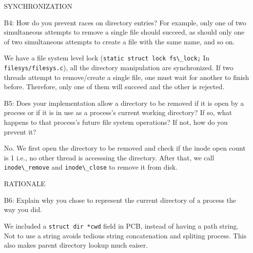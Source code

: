 \begin{aspect}{SYNCHRONIZATION}
	\begin{qc}
		B4: How do you prevent races on directory entries?  For example,
		only one of two simultaneous attempts to remove a single file
		should succeed, as should only one of two simultaneous attempts to
		create a file with the same name, and so on.
	\end{qc}
	We have a file system level lock (\lstinline{static struct lock fs\_lock;} In \lstinline{filesys/filesys.c}),
	all the directory manipulation are synchronized.
	If two threads attempt to remove/create a single file, one must wait for another to finish before.
	Therefore, only one of them will succeed and the other is rejected.

	\begin{qc}
		B5: Does your implementation allow a directory to be removed if it
		is open by a process or if it is in use as a process's current working directory?
		If so, what happens to that process's future file system operations?
		If not, how do you prevent it?
	\end{qc}
	No.
	We first open the directory to be removed and check if the inode open count is 1 i.e., no other thread is accesssing the directory.
	After that, we call \lstinline{inode\_remove} and \lstinline{inode\_close} to remove it from disk.
\end{aspect}


\begin{aspect}{RATIONALE}
	\begin{qc}
		B6: Explain why you chose to represent the current directory of a
		process the way you did.
	\end{qc}
	We included a \lstinline{struct dir *cwd} field in PCB, instead of having a path string.\\
	Not to use a string avoids tedious string concatenation and spliting process.
	This also makes parent directory lookup much eaiser.
\end{aspect}
